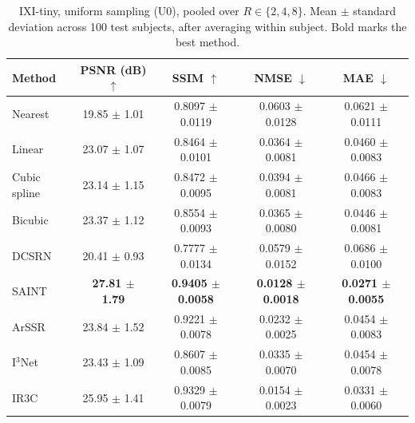 \begin{table}[pos=!htbp]
\caption{IXI-tiny, uniform sampling (U0), pooled over $R\in\{2,4,8\}$. Mean $\pm$ standard deviation across 100 test subjects, after averaging within subject. Bold marks the best method.}
\label{tab:detail-ixi}
\small
\begin{tabular*}{\textwidth}{@{\extracolsep{\fill}}lcccc@{}}
\toprule
Method & PSNR (dB) $\uparrow$ & SSIM $\uparrow$ & NMSE $\downarrow$ & MAE $\downarrow$ \\
\midrule
Nearest & 19.85 $\pm$ 1.01 & 0.8097 $\pm$ 0.0119 & 0.0603 $\pm$ 0.0128 & 0.0621 $\pm$ 0.0111 \\
Linear & 23.07 $\pm$ 1.07 & 0.8464 $\pm$ 0.0101 & 0.0364 $\pm$ 0.0081 & 0.0460 $\pm$ 0.0083 \\
Cubic spline & 23.14 $\pm$ 1.15 & 0.8472 $\pm$ 0.0095 & 0.0394 $\pm$ 0.0081 & 0.0466 $\pm$ 0.0083 \\
Bicubic & 23.37 $\pm$ 1.12 & 0.8554 $\pm$ 0.0093 & 0.0365 $\pm$ 0.0080 & 0.0446 $\pm$ 0.0081 \\
DCSRN & 20.41 $\pm$ 0.93 & 0.7777 $\pm$ 0.0134 & 0.0579 $\pm$ 0.0152 & 0.0686 $\pm$ 0.0100 \\
SAINT & \textbf{27.81 $\pm$ 1.79} & \textbf{0.9405 $\pm$ 0.0058} & \textbf{0.0128 $\pm$ 0.0018} & \textbf{0.0271 $\pm$ 0.0055} \\
ArSSR & 23.84 $\pm$ 1.52 & 0.9221 $\pm$ 0.0078 & 0.0232 $\pm$ 0.0025 & 0.0454 $\pm$ 0.0083 \\
I$^3$Net & 23.43 $\pm$ 1.09 & 0.8607 $\pm$ 0.0085 & 0.0335 $\pm$ 0.0070 & 0.0454 $\pm$ 0.0078 \\
IR3C & 25.95 $\pm$ 1.41 & 0.9329 $\pm$ 0.0079 & 0.0154 $\pm$ 0.0023 & 0.0331 $\pm$ 0.0060 \\
\bottomrule
\end{tabular*}
\end{table}

